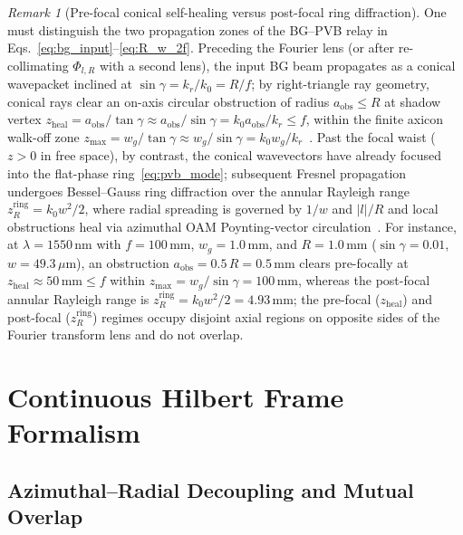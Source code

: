 \documentclass[aps,pra,reprint,nofootinbib,floatfix,longbibliography]{revtex4-2}
\theoremstyle{remark}
\newtheorem{remark}{Remark}
\newcommand{\abs}[1]{\lvert #1 \rvert}
\begin{document}
\begin{remark}[Pre-focal conical self-healing versus post-focal ring diffraction]
\label{rem:propagation}
One must distinguish the two propagation zones of the BG--PVB relay in Eqs.~\eqref{eq:bg_input}--\eqref{eq:R_w_2f}. Preceding the Fourier lens (or after re-collimating $\Phi_{l,R}$ with a second lens), the input BG beam propagates as a conical wavepacket inclined at $\sin\gamma = k_r/k_0 = R/f$; by right-triangle ray geometry, conical rays clear an on-axis circular obstruction of radius $a_{\mathrm{obs}} \le R$ at shadow vertex $z_{\mathrm{heal}} = a_{\mathrm{obs}}/\tan\gamma \approx a_{\mathrm{obs}}/\sin\gamma = k_0 a_{\mathrm{obs}}/k_r \le f$, within the finite axicon walk-off zone $z_{\max} = w_g/\tan\gamma \approx w_g/\sin\gamma = k_0 w_g/k_r$~\cite{Gori1987}. Past the focal waist ($z > 0$ in free space), by contrast, the conical wavevectors have already focused into the flat-phase ring~\eqref{eq:pvb_mode}; subsequent Fresnel propagation undergoes Bessel--Gauss ring diffraction over the annular Rayleigh range $z_R^{\mathrm{ring}} = k_0 w^2/2$, where radial spreading is governed by $1/w$ and $\abs{l}/R$ and local obstructions heal via azimuthal OAM Poynting-vector circulation~\cite{Reddy2016}. For instance, at $\lambda = 1550\,\mathrm{nm}$ with $f = 100\,\mathrm{mm}$, $w_g = 1.0\,\mathrm{mm}$, and $R = 1.0\,\mathrm{mm}$ ($\sin\gamma = 0.01$, $w = 49.3\,\mu\mathrm{m}$), an obstruction $a_{\mathrm{obs}} = 0.5\,R = 0.5\,\mathrm{mm}$ clears pre-focally at $z_{\mathrm{heal}} \approx 50\,\mathrm{mm} \le f$ within $z_{\max} = w_g/\sin\gamma = 100\,\mathrm{mm}$, whereas the post-focal annular Rayleigh range is $z_R^{\mathrm{ring}} = k_0 w^2/2 = 4.93\,\mathrm{mm}$; the pre-focal ($z_{\mathrm{heal}}$) and post-focal ($z_R^{\mathrm{ring}}$) regimes occupy disjoint axial regions on opposite sides of the Fourier transform lens and do not overlap.
\end{remark}

\section{Continuous Hilbert Frame Formalism}
\label{sec:frame_theory}

\subsection{Azimuthal--Radial Decoupling and Mutual Overlap}
\label{subsec:decoupling}
\end{document}
